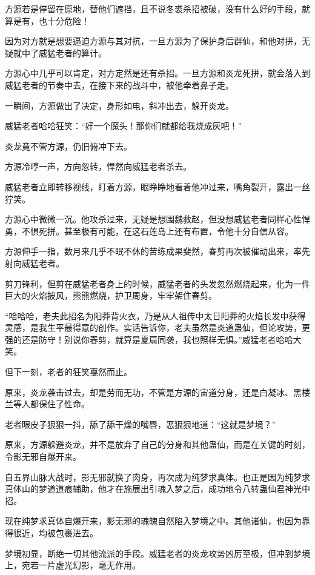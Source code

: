 \begin{this_body}
方源若是停留在原地，替他们遮挡，且不说冬裘杀招被破，没有什么好的手段，就算是有，也十分危险！

因为对方就是想要逼迫方源与其对抗，一旦方源为了保护身后群仙，和他对拼，无疑就中了威猛老者的算计。

方源心中几乎可以肯定，对方定然是还有杀招。一旦方源和炎龙死拼，就会落入到威猛老者的节奏中去，在接下来的战斗中，被他牵着鼻子走。

一瞬间，方源做出了决定，身形如电，斜冲出去，躲开炎龙。

威猛老者哈哈狂笑：“好一个魔头！那你们就都给我烧成灰吧！”

炎龙竟不管方源，仍旧俯冲下去。

方源冷哼一声，方向忽转，悍然向威猛老者杀去。

威猛老者立即转移视线，盯着方源，眼睁睁地看着他冲过来，嘴角裂开，露出一丝狞笑。

方源心中微微一沉。他攻杀过来，无疑是想围魏救赵，但没想威猛老者同样心性悍勇，不惧死拼。甚至极有可能，在这石莲岛上还有布置，令他十分自信从容。

方源伸手一指，数月来几乎不眠不休的苦练成果斐然，春剪再次被催动出来，率先射向威猛老者。

剪刀锋利，但剪在威猛老者身上的时候，威猛老者的头发忽然燃烧起来，化为一件巨大的火焰披风，熊熊燃烧，护卫周身，牢牢架住春剪。

“哈哈哈，老夫此招名为阳莽背火衣，乃是从人祖传中太日阳莽的火焰长发中获得灵感，是我生平最得意的创作。实话告诉你，老夫虽然是炎道蛊仙，但论攻势，更强的还是防守！别说你春剪，就算是夏扇同袭，我也照样无惧。”威猛老者哈哈大笑。

但下一刻，老者的狂笑戛然而止。

原来，炎龙袭击过去，却是劳而无功，不管是方源的宙道分身，还是白凝冰、黑楼兰等人都保住了性命。

老者眼皮子狠狠一抖，舔了舔干燥的嘴唇，恶狠狠地道：“这就是梦境？”

原来，方源躲避炎龙，并不是放弃了自己的分身和其他蛊仙，而是在关键的时刻，令影无邪自爆开来。

自五界山脉大战时，影无邪就换了肉身，再次成为纯梦求真体。也正是因为纯梦求真体山的梦道道痕辅助，他才在施展出引魂入梦之后，成功地令八转蛊仙君神光中招。

现在纯梦求真体自爆开来，影无邪的魂魄自然陷入梦境之中。其他诸仙，也因为靠得很近，均被包裹进去。

梦境初显，断绝一切其他流派的手段。威猛老者的炎龙攻势凶厉至极，但冲到梦境上，宛若一片虚光幻影，毫无作用。


\end{this_body}
